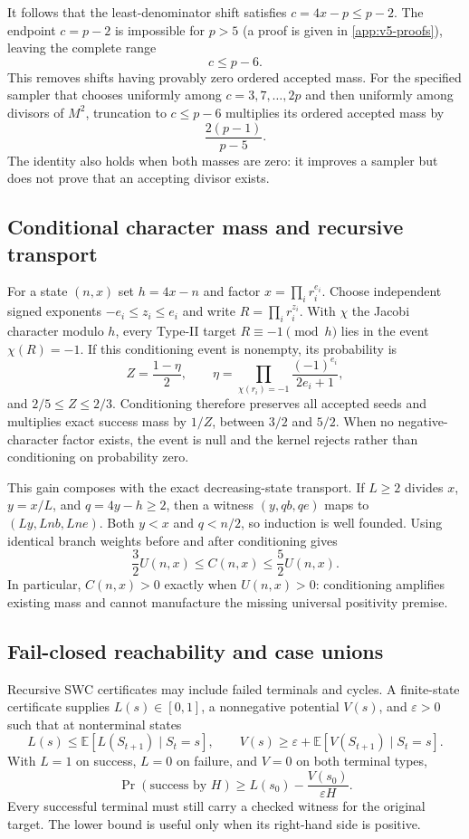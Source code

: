 It follows that the least-denominator shift satisfies $c=4x-p\le p-2$.
The endpoint $c=p-2$ is impossible for $p>5$ (a proof is given in
\cref{app:v5-proofs}), leaving the complete range
\[
  c\le p-6.
\]
This removes shifts having provably zero ordered accepted mass.  For the
specified sampler that chooses uniformly among $c=3,7,\ldots,2p$ and then
uniformly among divisors of $M^2$, truncation to $c\le p-6$ multiplies its
ordered accepted mass by
\[
  \frac{2(p-1)}{p-5}.
\]
The identity also holds when both masses are zero: it improves a sampler but
does not prove that an accepting divisor exists.

\subsection{Conditional character mass and recursive transport}

For a state $(n,x)$ set $h=4x-n$ and factor $x=\prod_i r_i^{e_i}$.
Choose independent signed exponents $-e_i\le z_i\le e_i$ and write
$R=\prod_i r_i^{z_i}$.  With $\chi$ the Jacobi character modulo $h$, every
Type-II target $R\equiv-1\pmod h$ lies in the event $\chi(R)=-1$.  If this
conditioning event is nonempty, its probability is
\[
  Z=\frac{1-\eta}{2},\qquad
  \eta=\prod_{\chi(r_i)=-1}\frac{(-1)^{e_i}}{2e_i+1},
\]
and $2/5\le Z\le2/3$.  Conditioning therefore preserves all accepted seeds
and multiplies exact success mass by $1/Z$, between $3/2$ and $5/2$.
When no negative-character factor exists, the event is null and the kernel
rejects rather than conditioning on probability zero.

This gain composes with the exact decreasing-state transport.  If $L\ge2$
divides $x$, $y=x/L$, and $q=4y-h\ge2$, then a witness
$(y,qb,qe)$ maps to $(Ly,Lnb,Lne)$.  Both $y<x$ and $q<n/2$, so induction is
well founded.  Using identical branch weights before and after conditioning
gives
\[
  \frac32 U(n,x)\le C(n,x)\le\frac52 U(n,x).
\]
In particular, $C(n,x)>0$ exactly when $U(n,x)>0$: conditioning amplifies
existing mass and cannot manufacture the missing universal positivity
premise.

\subsection{Fail-closed reachability and case unions}

Recursive SWC certificates may include failed terminals and cycles.  A
finite-state certificate supplies $L(s)\in[0,1]$, a nonnegative potential
$V(s)$, and $\varepsilon>0$ such that at nonterminal states
\[
  L(s)\le\mathbb E[L(S_{t+1})\mid S_t=s],\qquad
  V(s)\ge\varepsilon+\mathbb E[V(S_{t+1})\mid S_t=s].
\]
With $L=1$ on success, $L=0$ on failure, and $V=0$ on both terminal types,
\[
  \Pr(\text{success by }H)
  \ge L(s_0)-\frac{V(s_0)}{\varepsilon H}.
\]
Every successful terminal must still carry a checked witness for the original
target.  The lower bound is useful only when its right-hand side is positive.

